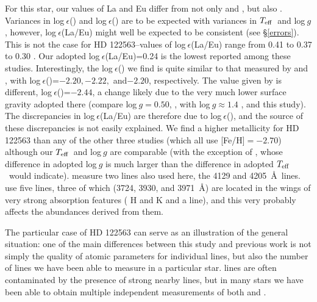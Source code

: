 \documentclass[12pt,preprint]{aastex}
\def\teff{\mbox{$T_{\rm {eff}}$}}
\begin{document}
{For this star, our values of La and Eu differ from not only \citet{Burris2000} and \citet{Johnson2002}, but also \citet{Westin2000}.  Variances in log$~\epsilon$() and log$~\epsilon$() are to be expected with variances in \teff~and log$~g$, however, log$~\epsilon$(La/Eu) might well be expected to be consistent (see \S \ref{errors}).  This is not the case for HD 122563--values of log$~\epsilon$(La/Eu) range from 0.41 \citep{Johnson2002} to 0.37 \citep{Westin2000} to 0.30 \citep{Burris2000}.  Our adopted log$~\epsilon$(La/Eu)=0.24 is the lowest reported among these studies.  Interestingly, the log$~\epsilon$() we find is quite similar to that measured by \citet{Westin2000} and \citet{Burris2000}, with log$~\epsilon$()=$-2.20,-2.22,$ and$ -2.20$, respectively.  The value given by \citet{Johnson2002} is different, log$~\epsilon$()=$-2.44$, a change likely due to the very much lower surface gravity adopted there (compare log$~g=0.50$, \citealt{Johnson2002}, with log$~g \approx 1.4$ \citealt{Westin2000, Burris2000}, and this study).  The discrepancies in log$~\epsilon$(La/Eu)  are therefore due to log$~\epsilon$(), and the source of these discrepancies is not easily explained.  We  find a higher metallicity for HD 122563 than any of the other three studies (which all use [Fe/H]$=-2.70$) although our \teff~and log$~g$ are comparable (with the exception of \citealt{Johnson2002}, whose difference in adopted log$~g$ is much larger than the difference in adopted \teff~would indicate).  \citet{Burris2000} measure two   lines also used here, the 4129 and 4205~\AA~lines.  \citet{Westin2000} use five lines, three of which (3724, 3930, and 3971~\AA)  are located in the wings of very strong absorption features (  H and K and a  line), and this very probably affects the abundances derived from them.  

The particular case of HD 122563 can  serve  as an illustration of the general situation: one of the main differences between this study and previous work is not simply the quality of atomic parameters for individual lines, but also the number of lines we have been able to measure in a particular star.   lines are often contaminated by the presence of strong nearby lines, but in many stars we have been able to obtain multiple independent measurements of both  and .  

}
\end{document}
